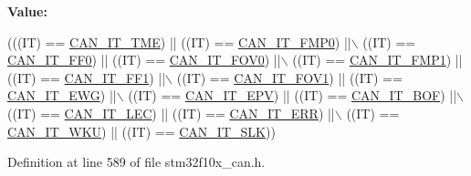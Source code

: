 {\bfseries Value\+:}
\begin{DoxyCode}
(((IT) == \hyperlink{group___c_a_n__interrupts_ga619e36230fa2eb089a7c1936b5004eb9}{CAN\_IT\_TME}) || ((IT) == \hyperlink{group___c_a_n__interrupts_ga3fe6fbf53e9d692957e87ad329bcd362}{CAN\_IT\_FMP0})  ||\(\backslash\)
                             ((IT) == \hyperlink{group___c_a_n__interrupts_gabf63043d9216de80ddc7ffe57b23ef67}{CAN\_IT\_FF0})  || ((IT) == 
      \hyperlink{group___c_a_n__interrupts_ga066a4317f95669e5b5931c9a759cf248}{CAN\_IT\_FOV0})  ||\(\backslash\)
                             ((IT) == \hyperlink{group___c_a_n__interrupts_gaa0e101053fb203629e0e9a954213e71e}{CAN\_IT\_FMP1}) || ((IT) == 
      \hyperlink{group___c_a_n__interrupts_ga93b86d884ce0624b4b36c991fd75fc1c}{CAN\_IT\_FF1})   ||\(\backslash\)
                             ((IT) == \hyperlink{group___c_a_n__interrupts_ga963301fdbede5f9a9665dc5b6210eaec}{CAN\_IT\_FOV1}) || ((IT) == 
      \hyperlink{group___c_a_n__interrupts_ga8a9f04ddf6ebe169d32b951a8ea135b3}{CAN\_IT\_EWG})   ||\(\backslash\)
                             ((IT) == \hyperlink{group___c_a_n__interrupts_ga006b7b641d337a599ceac64b483e75dd}{CAN\_IT\_EPV})  || ((IT) == 
      \hyperlink{group___c_a_n__interrupts_gad63c39e6237aa07681a1f8ce2ff9e167}{CAN\_IT\_BOF})   ||\(\backslash\)
                             ((IT) == \hyperlink{group___c_a_n__interrupts_gad670b6f001bf67f24e17d91ada50a61c}{CAN\_IT\_LEC})  || ((IT) == 
      \hyperlink{group___c_a_n__interrupts_ga65f1781c9165a2e9b5f77f1ed3990741}{CAN\_IT\_ERR})   ||\(\backslash\)
                             ((IT) == \hyperlink{group___c_a_n__interrupts_gac9c8767770d94de753dda9ad31f9af15}{CAN\_IT\_WKU})  || ((IT) == 
      \hyperlink{group___c_a_n__interrupts_ga639d4ab2777d9a2f8b7e67071b091059}{CAN\_IT\_SLK}))
\end{DoxyCode}


Definition at line 589 of file stm32f10x\+\_\+can.\+h.

